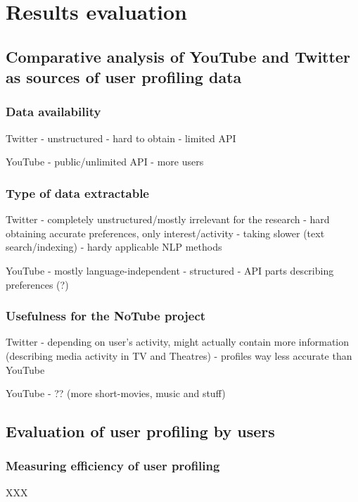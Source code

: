 \section{Results evaluation}

\subsection{Comparative analysis of YouTube and Twitter as sources of user
profiling data}

\subsubsection{Data availability}
Twitter
- unstructured
- hard to obtain
- limited API

YouTube
- public/unlimited API
- more users

\subsubsection{Type of data extractable}
Twitter
- completely unstructured/mostly irrelevant for the research
- hard obtaining accurate preferences, only interest/activity
- taking slower (text search/indexing)
- hardy applicable NLP methods

YouTube
- mostly language-independent
- structured
- API parts describing preferences (?)

\subsubsection{Usefulness for the NoTube project}
Twitter
- depending on user's activity, might actually contain more information (describing media activity in TV and Theatres)
- profiles way less accurate than YouTube

YouTube
- ?? (more short-movies, music and stuff)

\subsection{Evaluation of user profiling by users}
\subsubsection{Measuring efficiency of user profiling}
XXX
